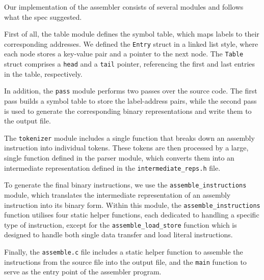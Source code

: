 \documentclass[9pt,a4paper]{article}
\begin{document}
\noindent
\begin{minipage}[t]{0.52\textwidth}
\vspace{0pt}
Our implementation of the assembler consists of several modules and follows what the spec suggested.

\vspace{\baselineskip}
First of all, the table module defines the symbol table, which maps labels to their corresponding addresses. We defined the \verb|Entry| struct in a linked list style, where each node stores a key-value pair and a pointer to the next node. The \verb|Table| struct comprises a \verb|head| and a \verb|tail| pointer, referencing the first and last entries in the table, respectively.

\vspace{\baselineskip}
In addition, the \verb|pass| module performs two passes over the source code. The first pass builds a symbol table to store the label-address pairs, while the second pass is used to generate the corresponding binary representations and write them to the output file.

\vspace{\baselineskip}
The \verb|tokenizer| module includes a single function that breaks down an assembly instruction into individual tokens. These tokens are then processed by a large, single function defined in the parser module, which converts them into an intermediate representation defined in the \verb|intermediate_reps.h| file.

\vspace{\baselineskip}
To generate the final binary instructions, we use the \verb|assemble_instructions| module, which translates the intermediate representation of an assembly instruction into its binary form. Within this module, the \verb|assemble_instructions| function utilises four static helper functions, each dedicated to handling a specific type of instruction, except for the \verb|assemble_load_store| function which is designed to handle both single data transfer and load literal instructions.

\vspace{\baselineskip}
Finally, the \verb|assemble.c| file includes a static helper function to assemble the instructions from the source file into the output file, and the \verb|main| function to serve as the entry point of the assembler program.
\end{minipage}
\hfill
\end{document}
